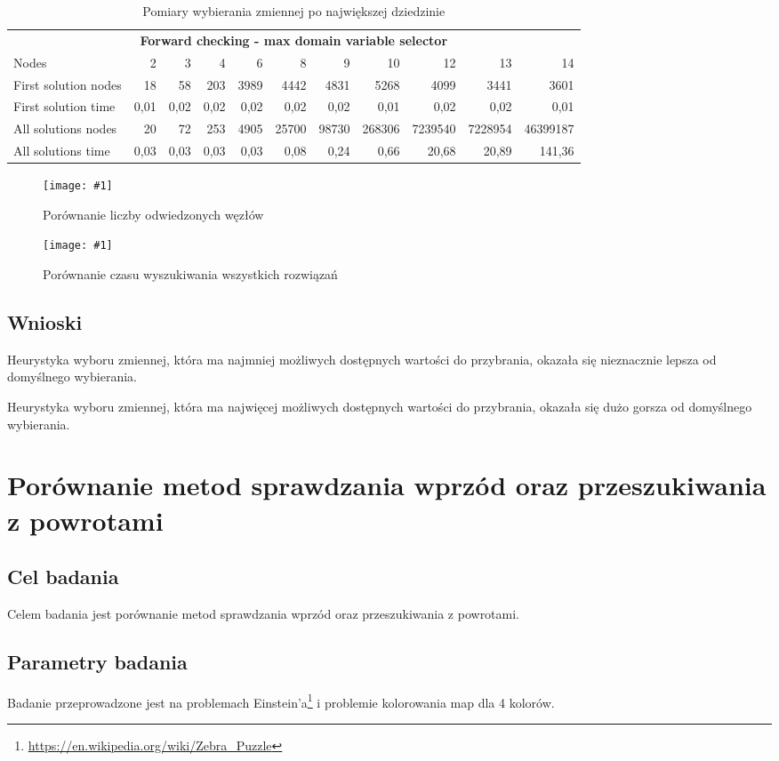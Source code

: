 \documentclass[12pt,a4paper]{article}
\newcommand{\image}[2] {
    \begin{figure}[H]
        \begin{center}
            \texttt{[image: \#1]}
        \end{center}
        \caption{#2}
        \label{#1}
    \end{figure}
}
\begin{document}
\begin{table}[htbp]
  \centering
    \begin{tabular}{lrrrrrrrrrr}
    \multicolumn{11}{c}{\textbf{Forward checking - max domain variable selector}} \\
    Nodes & 2     & 3     & 4     & 6     & 8     & 9     & 10    & 12    & 13    & 14 \\
\cmidrule{2-11}    First solution nodes & 18    & 58    & 203   & 3989  & 4442  & 4831  & 5268  & 4099  & 3441  & 3601 \\
    First solution time & 0,01  & 0,02  & 0,02  & 0,02  & 0,02  & 0,02  & 0,01  & 0,02  & 0,02  & 0,01 \\
    All solutions nodes & 20    & 72    & 253   & 4905  & 25700 & 98730 & 268306 & 7239540 & 7228954 & 46399187 \\
    All solutions time & 0,03  & 0,03  & 0,03  & 0,03  & 0,08  & 0,24  & 0,66  & 20,68 & 20,89 & 141,36 \\
    \end{tabular}%
  \caption{Pomiary wybierania zmiennej po największej dziedzinie}
  \label{tab:addlabel}%
\end{table}%


\image{Arkusz1_3}{Porównanie liczby odwiedzonych węzłów}
\image{Arkusz1_4}{Porównanie czasu wyszukiwania wszystkich rozwiązań}
\subsection{Wnioski}
Heurystyka wyboru zmiennej, która ma najmniej możliwych dostępnych wartości do przybrania, okazała się nieznacznie lepsza od domyślnego wybierania.

Heurystyka wyboru zmiennej, która ma najwięcej możliwych dostępnych wartości do przybrania, okazała się dużo gorsza od domyślnego wybierania.


\newpage
\section{Porównanie metod sprawdzania wprzód oraz przeszukiwania z powrotami}

\subsection{Cel badania}
Celem badania jest porównanie metod sprawdzania wprzód oraz przeszukiwania z powrotami.

\subsection{Parametry badania}
Badanie przeprowadzone jest na problemach Einstein'a\footnote{\url{https://en.wikipedia.org/wiki/Zebra_Puzzle}} i problemie kolorowania map dla 4 kolorów.
\end{document}
